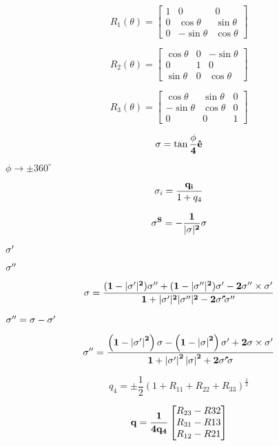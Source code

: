\documentclass{article}
\begin{document}
\[ R_1\left(\theta\right) = \begin{bmatrix} 1 & 0 & 0\\ 0 & \cos{\theta} & \sin{\theta}\\ 0 & -\sin{\theta} & \cos{\theta} \end{bmatrix} \]
\pagebreak

\[ R_2\left(\theta\right) = \begin{bmatrix} \cos{\theta} & 0 & -\sin{\theta}\\ 0 & 1 & 0\\ \sin{\theta} & 0 & \cos{\theta} \end{bmatrix} \]
\pagebreak

\[ R_3\left(\theta\right) = \begin{bmatrix} \cos{\theta} & \sin{\theta} & 0\\ -\sin{\theta} & \cos{\theta} & 0\\ 0 & 0 & 1 \end{bmatrix} \]
\pagebreak

\[ \bf{\sigma} = \tan{\frac{\phi}{4}}\bf{\hat{e}} \]
\pagebreak

$\phi \rightarrow \pm 360^{\circ}$
\pagebreak

\[\sigma_i = \frac{\bf{q}_i}{1+q_4}\]
\pagebreak

\[ \bf{\sigma}^{S} = - \frac{1}{|\bf{\sigma}|^2}\bf{\sigma} \]
\pagebreak

$\bf{\sigma'}$
\pagebreak

$\bf{\sigma''}$
\pagebreak

\[ \bf{\sigma} = \frac{(1-|\bf{\sigma'}|^2)\bf{\sigma''}+(1-|\bf{\sigma''}|^2)\bf{\sigma'}-2\bf{\sigma''} \times \bf{\sigma'}}{1+|\bf{\sigma'}|^2|\bf{\sigma''}|^2-2\bf{\sigma'} \dot \bf{\sigma''}} \]
\pagebreak

$\bf{\sigma''} = \bf{\sigma} - \bf{\sigma'}$
\pagebreak

\[ \bf{\sigma''} = \frac{\left(1-\left|\bf{\sigma'}\right|^2\right)\bf{\sigma}-\left(1-\left|\bf{\sigma}\right|^2\right)\bf{\sigma'}+2\bf{\sigma} \times \bf{\sigma'}}{1+\left|\bf{\sigma'}\right|^2\left|\bf{\sigma}\right|^2+2\bf{\sigma'} \dot \bf{\sigma}} \]
\pagebreak

\[q_4 = \pm \frac{1}{2}\left(1+R_{11}+R_{22}+R_{33}\right)^{\frac{1}{2}}\]
\pagebreak

\[ \bf{q} = \frac{1}{4q_4} \begin{bmatrix} R_{23}-R{32} \\ R_{31}-R{13} \\ R_{12}-R{21} \end{bmatrix}\]
\pagebreak
\end{document}
